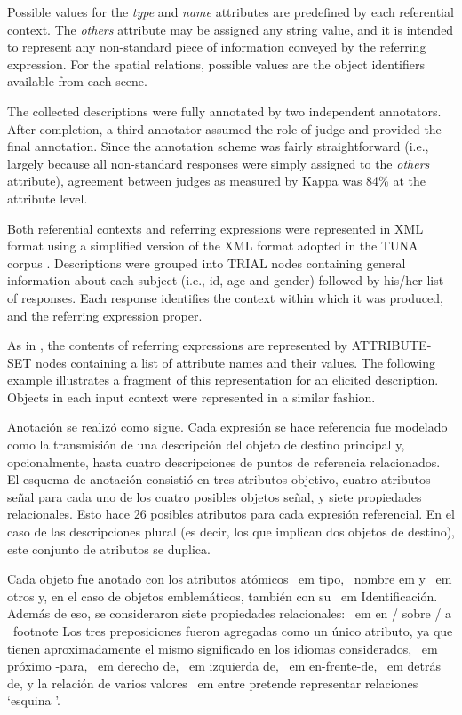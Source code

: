 Possible values for the {\em type} and {\em name} attributes are predefined by each referential context. The {\em others} attribute may be assigned any string value, and it is intended to represent any non-standard piece of information conveyed by the referring expression. For the spatial relations, possible values are the object identifiers available from each scene.

The collected descriptions were fully annotated by two independent annotators. After completion, a third annotator assumed the role of judge and provided the final annotation. Since the annotation scheme was fairly straightforward (i.e., largely because all non-standard responses were simply assigned to the {\em others} attribute), agreement between judges as measured by Kappa \cite{kappa} was 84\% at the attribute level. 

Both referential contexts and referring expressions were represented in XML format using a simplified version of the XML format adopted in the TUNA corpus \cite{tuna-corpus}. Descriptions were grouped into TRIAL nodes containing general information about each subject (i.e., id, age and gender) followed by his/her list of responses. Each response identifies the context within which it was produced, and the referring expression proper. 

As in \cite{tuna-corpus}, the contents of referring expressions are represented by ATTRIBUTE-SET nodes containing a list of attribute names and their values. The following example illustrates a fragment of this representation for an elicited description. Objects in each input context were represented in a similar fashion.

Anotaci\'on se realiz\'o como sigue. Cada expresi\'on se hace referencia fue modelado como la transmisi\'on de una descripci\'on del objeto de destino principal y, opcionalmente, hasta cuatro descripciones de puntos de referencia relacionados. El esquema de anotaci\'on consisti\'o en tres atributos objetivo, cuatro atributos se\~nal para cada uno de los cuatro posibles objetos se\~nal, y siete propiedades relacionales. Esto hace 26 posibles atributos para cada expresi\'on referencial. En el caso de las descripciones plural (es decir, los que implican dos objetos de destino), este conjunto de atributos se duplica.

Cada objeto fue anotado con los atributos at\'omicos {\ em tipo}, {\ nombre em} y {\ em otros} y, en el caso de objetos emblem\'aticos, tambi\'en con su {\ em Identificaci\'on}. Adem\'as de eso, se consideraron siete propiedades relacionales: {\ em en / sobre / a} \ footnote {Los tres preposiciones fueron agregadas como un \'unico atributo, ya que tienen aproximadamente el mismo significado en los idiomas considerados}, {\ em pr\'oximo -para}, {\ em derecho de}, {\ em izquierda de}, {\ em en-frente-de}, {\ em detr\'as de}, y la relaci\'on de varios valores {\ em entre} pretende representar relaciones `esquina '.

